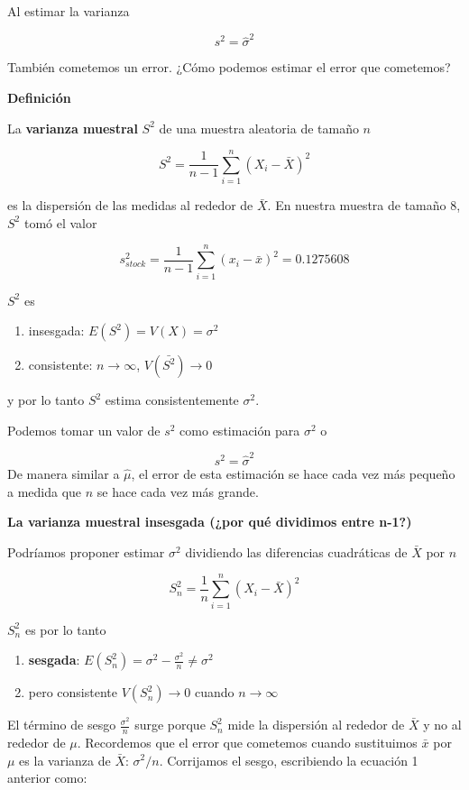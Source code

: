 \documentclass[
]{book}
\providecommand{\tightlist}{%
  \setlength{\itemsep}{0pt}\setlength{\parskip}{0pt}}
\begin{document}
Al estimar la varianza

\[s^2=\hat{\sigma}^2\]

También cometemos un error. ¿Cómo podemos estimar el error que cometemos?

\textbf{Definición}

La \textbf{varianza muestral} \(S^2\) de una muestra aleatoria de tamaño \(n\)

\[S^2= \frac{1}{n-1}\sum_{i=1}^n (X_i-\bar{X})^2\]

es la dispersión de las medidas al rededor de \(\bar{X}\). En nuestra muestra de tamaño \(8\), \(S^2\) tomó el valor

\[s_{stock}^2=\frac{1}{n-1}\sum_{i=1}^n (x_i-\bar{x})^2=0.1275608\]

\(S^2\) es

\begin{enumerate}
\def\labelenumi{\arabic{enumi})}
\tightlist
\item
  insesgada: \(E(S^2)=V(X)=\sigma^2\)
\item
  consistente: \(n \rightarrow \infty\), \(V(\bar{S^2}) \rightarrow 0\)
\end{enumerate}

y por lo tanto \(S^2\) estima consistentemente \(\sigma^2\).

Podemos tomar un valor de \(s^2\) como estimación para \(\sigma^2\) o

\[s^2=\hat{\sigma}^2\]
De manera similar a \(\hat{\mu}\), el error de esta estimación se hace cada vez más pequeño a medida que \(n\) se hace cada vez más grande.

\textbf{La varianza muestral insesgada (¿por qué dividimos entre n-1?)}

Podríamos proponer estimar \(\sigma^2\) dividiendo las diferencias cuadráticas de \(\bar{X}\) por \(n\)

\[S_n^2=\frac{1}{n}\sum_{i=1}^n (X_i-\bar{X})^2\]

\(S_n^2\) es por lo tanto

\begin{enumerate}
\def\labelenumi{\arabic{enumi})}
\tightlist
\item
  \textbf{sesgada}: \(E(S_n^2) = \sigma^2-\frac{\sigma^2}{n} \neq \sigma^2\)
\item
  pero consistente \(V(S_n^2) \rightarrow 0\) cuando \(n\rightarrow \infty\)
\end{enumerate}

El término de sesgo \(\frac{\sigma^2}{n}\) surge porque \(S_n^2\) mide la dispersión al rededor de \(\bar{X}\) y no al rededor de \(\mu\). Recordemos que el error que cometemos cuando sustituimos \(\bar{x}\) por \(\mu\) es la varianza de \(\bar{X}\): \(\sigma^2/n\). Corrijamos el sesgo, escribiendo la ecuación 1 anterior como:
\end{document}
